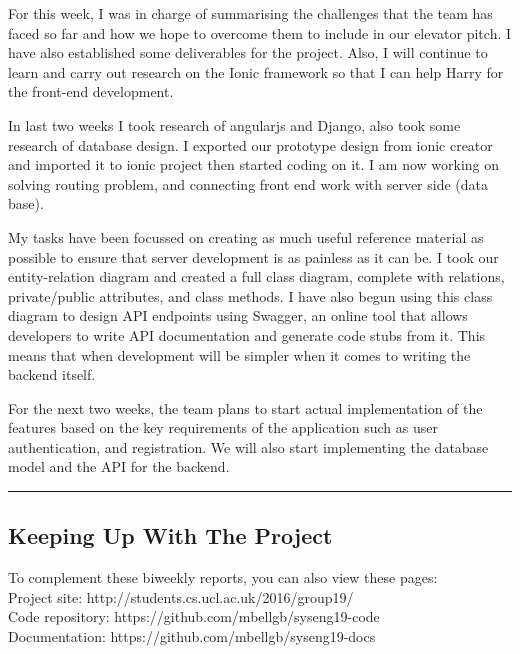 \documentclass[11pt]{report}
\begin{document}
\bigskip
{}
\smallskip

\noindent
For this week, I was in charge of summarising the challenges that the team has
faced so far and how we hope to overcome them to include in our elevator pitch.
I have also established some deliverables for the project. Also, I will continue
to learn and carry out research on the Ionic framework so that I can help Harry
for the front-end development.

\bigskip
{}
\smallskip

\noindent
In last two weeks I took research of angularjs and Django, also took some
research of database design. I exported our prototype design from ionic creator
and imported it to ionic project then started coding on it. I am now working on
solving routing problem, and connecting front end work with server side (data
base).

\bigskip
{}
\smallskip

\noindent
My tasks have been focussed on creating as much useful reference material as
possible to ensure that server development is as painless as it can be. I took
our entity-relation diagram and created a full class diagram, complete with
relations, private/public attributes, and class methods. I have also begun using
this class diagram to design API endpoints using Swagger, an online tool that
allows developers to write API documentation and generate code stubs from it.
This means that when development will be simpler when it comes to writing the
backend itself.

\bigskip
{}
\smallskip

\noindent
For the next two weeks, the team plans to start actual implementation of the
features based on the key requirements of the application such as user
authentication, and registration. We will also start implementing the database
model and the API for the backend.

\hrule

\subsection*{Keeping Up With The Project}

To complement these biweekly reports, you can also view these pages:\\

\noindent
Project site: http://students.cs.ucl.ac.uk/2016/group19/\\

\noindent
Code repository: https://github.com/mbellgb/syseng19-code\\

\noindent
Documentation: https://github.com/mbellgb/syseng19-docs
\end{document}
